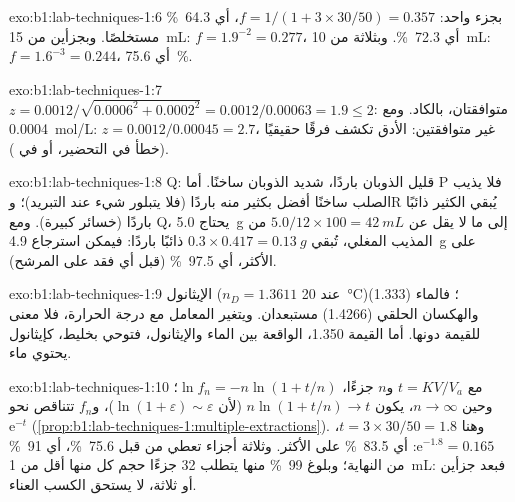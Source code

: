\begin{solution}{exo:b1:lab-techniques-1:6}
بجزء واحد: $f = 1/(1 + 3 \times 30/50) = 0.357$، أي \qty{64.3}{\percent}
مستخلصًا. وبجزأين من \qty{15}{mL}: $f = 1.9^{-2} = 0.277$،
أي \qty{72.3}{\percent}. وبثلاثة من \qty{10}{mL}: $f = 1.6^{-3} = 0.244$،
أي \qty{75.6}{\percent}.
\end{solution}

\begin{solution}{exo:b1:lab-techniques-1:7}
$z = 0.0012/\sqrt{0.0006^2 + 0.0002^2} = 0.0012/0.00063 = 1.9 \le 2$:
متوافقتان، بالكاد. ومع \qty{0.0004}{mol/L}: $z = 0.0012/0.00045 = 2.7$،
غير متوافقتين:  الأدق تكشف فرقًا حقيقيًا
(خطأ في التحضير، أو في ).
\end{solution}

\begin{solution}{exo:b1:lab-techniques-1:8}
Q: قليل الذوبان باردًا، شديد الذوبان ساخنًا. أما P فلا يذيب الصلب ساخنًا أفضل
بكثير منه باردًا (فلا يتبلور شيء عند التبريد)؛ وR يُبقي الكثير
ذائبًا باردًا (خسائر كبيرة). ومع Q، يحتاج \qty{5.0}{g} إلى ما لا يقل عن
$5.0/12 \times 100 = \qty{42}{mL}$ من المذيب المغلي، تُبقي
$0.3 \times 0.417 = \qty{0.13}{g}$ ذائبًا باردًا: فيمكن استرجاع
\qty{4.9}{g} على الأكثر، أي \qty{97.5}{\percent} (قبل أي فقد على
المرشح).
\end{solution}

\begin{solution}{exo:b1:lab-techniques-1:9}
الإيثانول ($n_D = 1.3611$ عند \qty{20}{\celsius})؛ فالماء (1.333)
والهكسان الحلقي (1.4266) مستبعدان. ويتغير المعامل مع درجة الحرارة،
فلا معنى للقيمة دونها. أما القيمة 1.350، الواقعة بين الماء
والإيثانول، فتوحي بخليط، كإيثانول يحتوي ماء.
\end{solution}

\begin{solution}{exo:b1:lab-techniques-1:10}
مع $t = KV/V_a$ و$n$ جزءًا، $\ln f_n = -n\ln(1 + t/n)$؛ وحين
$n \to \infty$، يكون $n \ln(1 + t/n) \to t$ (لأن $\ln(1 + \varepsilon) \sim
\varepsilon$)، و$f_n$ تتناقص نحو $\mathrm{e}^{-t}$ (\cref{prop:b1:lab-techniques-1:multiple-extractions}).
وهنا $t = 3 \times 30/50 = 1.8$، $\mathrm{e}^{-1.8} = 0.165$: أي
\qty{83.5}{\percent} على الأكثر. وثلاثة أجزاء تعطي من قبل \qty{75.6}{\percent}،
أي \qty{91}{\percent} من النهاية؛ وبلوغ \qty{99}{\percent} منها يتطلب 32
جزءًا حجم كل منها أقل من \qty{1}{mL}: فبعد جزأين أو ثلاثة، لا يستحق الكسب
العناء.
\end{solution}

